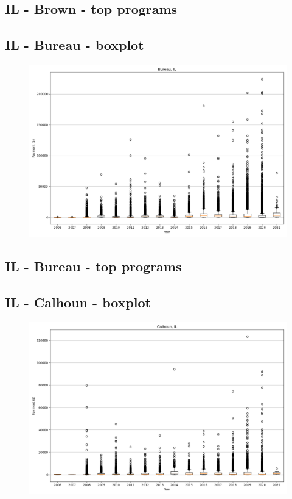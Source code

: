 \subsection*{IL - Brown - top programs}

\newpage
\subsection*{IL - Bureau - boxplot}
\begin{figure}[h]
\centering
\includegraphics[width=7in]{../output/boxplots/counties/Bureau-IL_boxplot.png}
\end{figure}


\subsection*{IL - Bureau - top programs}

\newpage
\subsection*{IL - Calhoun - boxplot}
\begin{figure}[h]
\centering
\includegraphics[width=7in]{../output/boxplots/counties/Calhoun-IL_boxplot.png}
\end{figure}


